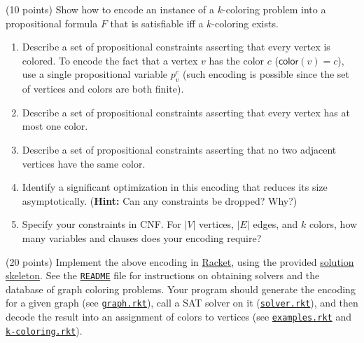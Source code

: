 \documentclass{handout}
\begin{document}
\begin{questions}
\item (10 points) Show how to encode an instance of a $k$-coloring problem into a propositional formula $F$ that is satisfiable iff a $k$-coloring exists.
\begin{enumerate}
\item Describe a set of propositional constraints asserting that every vertex is colored.  To encode the fact that a vertex $v$ has the color $c$ ($\mathsf{color}(v) = c$), use a single propositional variable $p^c_v$ (such encoding is possible since the set of vertices and colors are both finite).


\item Describe a set of propositional constraints asserting that every vertex has at most one color.



\item Describe a set of propositional constraints asserting that no two adjacent vertices have the same color.



\item Identify a significant optimization in this encoding that reduces its size asymptotically.  (\textbf{Hint:} Can any constraints be dropped?  Why?)



\item Specify your constraints in CNF.  For $|V|$ vertices, $|E|$ edges, and $k$ colors, how many variables and clauses does your encoding require?



\end{enumerate} \label{prob:encoding}

\item (20 points) \label{prob:kcol} Implement the above encoding in \href{http://racket-lang.org}{Racket}, using the provided \href{\gitlab/tree/master/hw1/graph-coloring}{solution skeleton}.  See the  \href{\gitlab/blob/master/hw1/README.md}{\texttt{README}} file for instructions on obtaining solvers and the database of graph coloring problems.  Your program should generate the encoding for a given graph (see \href{\gitlab/tree/master/hw1/graph-coloring/graph.rkt}{\texttt{graph.rkt}}), call a SAT solver on it (\href{\gitlab/tree/master/hw1/graph-coloring/solver.rkt}{\texttt{solver.rkt}}), and then decode the result into an assignment of colors to vertices  (see \href{\gitlab/tree/master/hw1/graph-coloring/examples.rkt}{\texttt{examples.rkt}} and \href{\gitlab/tree/master/hw1/graph-coloring/k-coloring.rkt}{\texttt{k-coloring.rkt}}).


\end{questions}
\end{document}
